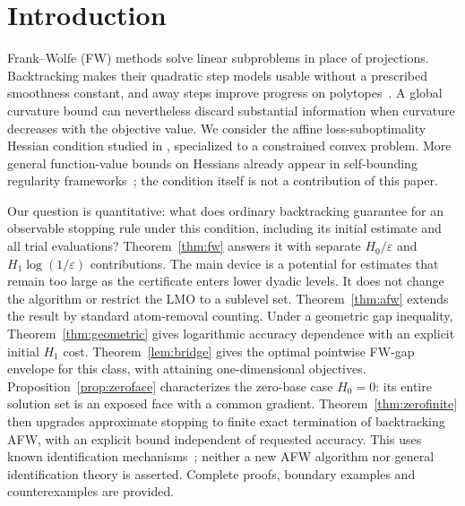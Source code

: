 \section{Introduction}
Frank--Wolfe (FW) methods solve linear subproblems in place of
projections. Backtracking makes their quadratic step models usable
without a prescribed smoothness constant, and away steps improve
progress on polytopes~\cite{braun,pedregosa,lacostejaggi}.
A global curvature bound can nevertheless discard substantial
information when curvature decreases with the objective value.
We consider the affine loss-suboptimality Hessian condition studied in
\cite{warmup}, specialized to a constrained convex problem. More general
function-value bounds on Hessians already appear in self-bounding
regularity frameworks~\cite{kale,caoselfbound}; the condition itself is
not a contribution of this paper.

Our question is quantitative: what does ordinary backtracking guarantee
for an observable stopping rule under this condition, including its
initial estimate and all trial evaluations? Theorem~\ref{thm:fw}
answers it with separate $H_0/\varepsilon$ and $H_1\log(1/\varepsilon)$
contributions. The main device is a potential for estimates that remain
too large as the certificate enters lower dyadic levels. It does not
change the algorithm or restrict the LMO to a sublevel set.
Theorem~\ref{thm:afw} extends the result by standard atom-removal
counting. Under a geometric gap inequality,
Theorem~\ref{thm:geometric} gives logarithmic accuracy dependence with
an explicit initial $H_1$ cost. Theorem~\ref{lem:bridge} gives the
optimal pointwise FW-gap envelope for this class, with attaining
one-dimensional objectives. Proposition~\ref{prop:zeroface} characterizes
the zero-base case $H_0=0$: its entire solution set is an exposed face
with a common gradient. Theorem~\ref{thm:zerofinite} then upgrades
approximate stopping to finite exact termination of backtracking AFW,
with an explicit bound independent of requested accuracy. This uses
known identification mechanisms~\cite{bomze,garber}; neither a new AFW
algorithm nor general identification theory is asserted.
Complete proofs, boundary examples and counterexamples are provided.


